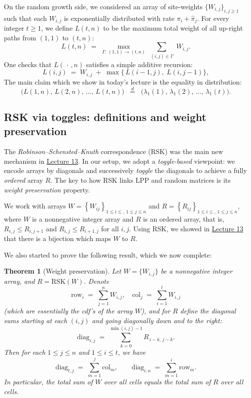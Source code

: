 \documentclass[letterpaper,11pt,oneside,reqno]{article}
\numberwithin{equation}{section}
\newtheorem{theorem}[proposition]{Theorem}
\theoremstyle{definition}
\begin{document}
On the random growth side, we considered an array of
site-weights $\{W_{i,j}\}_{i,j\ge1}$ such that each
$W_{i,j}$ is exponentially distributed with rate $\pi_i +
\hat\pi_j$.  For every integer $t\ge1$, we define $L(t,n)$
to be the maximum total weight of all up-right paths from
$(1,1)$ to $(t,n)$:
\[
L(t,n)\;=\;\max_{\Gamma:\,(1,1)\to(t,n)} \;\sum_{(i,j)\in\Gamma}\; W_{i,j}.
\]
One checks that $L(\,\cdot\,,n)$ satisfies a simple additive recursion:
\[
L(i,j)
\;=\;
W_{i,j}\;+\;\max\bigl\{\,L(i-1,j),\;L(i,j-1)\bigr\},
\]
The main claim which we show in today's lecture is the equality in distribution:
\begin{equation}
	\label{eq:main-claim}
\bigl(L(1,n),\,L(2,n),\,\dots,\,L(t,n)\bigr)
\;\;\stackrel{d}{=}\;\;
\bigl(\lambda_1(1),\,\lambda_1(2),\,\dots,\,\lambda_1(t)\bigr).
\end{equation}

\subsection{RSK via toggles: definitions and weight preservation}

The \emph{Robinson--Schensted--Knuth} correspondence (RSK) was the main new mechanism in
\href{https://lpetrov.cc/rmt25/rmt25-notes/rmt2025-l13.pdf}{Lecture 13}.
In our setup, we adopt a \emph{toggle-based} viewpoint: we
encode arrays by diagonals and successively \emph{toggle}
the diagonals to achieve a fully \emph{ordered} array $R$.
The key to how RSK links LPP and random matrices is its \emph{weight preservation} property.

We work with arrays $W=\left\{ W_{ij} \right\}_{1\le i\le,\ 1\le j\le n}$
and $R=\left\{ R_{ij} \right\}_{1\le i\le,\ 1\le j\le n}$,
where $W$ is a nonnegative integer array and $R$ is an ordered array, that is,
$R_{i,j}\le R_{i,j+1}$ and $R_{i,j}\le R_{i+1,j}$ for all $i,j$. Using RSK,
we showed in \href{https://lpetrov.cc/rmt25/rmt25-notes/rmt2025-l13.pdf}{Lecture 13} that
there is a bijection which maps $W$ to $R$.

We also started to prove the following result, which we now complete:

\begin{theorem}[Weight preservation]
\label{thm:WeightPreservationRecap}
Let $W=\{W_{i,j}\}$ be a nonnegative integer array, and $R=\mathrm{RSK}(W)$.  Denote
\[
\mathrm{row}_i \;=\; \sum_{j=1}^{n} W_{i,j},
\quad
\mathrm{col}_j \;=\; \sum_{i=1}^{t} W_{i,j}
\]
(which are essentially the cdf's of the array $W$\/),
and for $R$ define the diagonal sums starting at each $(i,j)$ and going diagonally down and to the right:
\[
\mathrm{diag}_{i,j}
\;=\;
\sum_{k=0}^{\min(i,j)-1} R_{\,i-k,\,j-k}.
\]
Then for each $1\le j\le n$ and $1\le i\le t$, we have
\begin{equation}
\label{eq:diagIdentityRecap}
\mathrm{diag}_{t,j}
\;=\;
\sum_{m=1}^{j}\mathrm{col}_{m},
\qquad
\mathrm{diag}_{i,n}
\;=\;
\sum_{m=1}^{i}\mathrm{row}_{m}.
\end{equation}
In particular,
the total sum of $W$ over all cells equals the total sum of $R$ over all cells.
\end{theorem}
\end{document}

